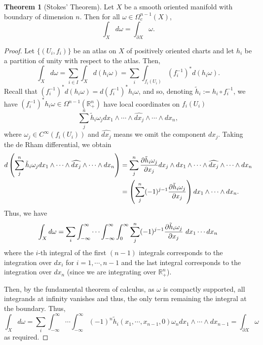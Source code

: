 \documentclass[]{article}
\theoremstyle{definition}
\newtheorem{theorem}{Theorem}
\theoremstyle{definition}
\begin{document}
\begin{theorem}[Stokes' Theorem]
  Let \(X\) be a smooth oriented manifold with boundary of dimension \(n\). 
  Then for all \(\omega \in \Omega^{n - 1}_c(X)\), 
  \[\int_X d\omega = \int_{\partial X}\omega.\]  
\end{theorem}
\begin{proof}
  Let \(\{(U_i, f_i)\}\) be an atlas on \(X\) of positively oriented charts and 
  let \(h_i\) be a partition of unity with respect to the atlas. Then, 
  \[\int_X d\omega = \sum_{i \in I}\int_X d(h_i \omega) 
    = \sum_i \int_{f_i(U_i)} (f_i^{-1})^* d(h_i \omega).\]
  Recall that \((f_i^{-1})^* d(h_i\omega) = d(f_i^{-1})^* h_i\omega\), and so, 
  denoting \(\tilde h_i := h_i \circ f_i^{-1}\), we have 
  \((f_i^{-1})^* h_i \omega \in \Omega^{n-1}(\mathbb{R}^n_+)\) have local 
  coordinates on \(f_i(U_i)\) 
  \[\sum_j^n \tilde h_i \omega_j dx_1 \wedge \cdots \wedge \widehat{dx_j} \wedge 
    \cdots \wedge dx_n,\]
  where \(\omega_j \in C^\infty(f_i(U_i))\) and \(\widehat{dx_j}\) means we omit 
  the component \(dx_j\). Taking the de Rham differential, we obtain 
  \[\begin{split}
    d\left(\sum_j^n \tilde h_i \omega_j dx_1 \wedge \cdots \wedge \widehat{dx_j} \wedge 
  \cdots \wedge dx_n\right) 
  & = \sum_j^n \pdv{\tilde h_i \omega_j}{x_j} dx_j \wedge
  dx_1 \wedge \cdots \wedge \widehat{dx_j} \wedge 
  \cdots \wedge dx_n\\
  & = \left(\sum_j^n (-1)^{j - 1}\pdv{\tilde h_i \omega_j}{x_j}\right)
  dx_1 \wedge \cdots \wedge dx_n.
  \end{split}\]
  Thus, we have 
  \[\int_X d\omega = \sum_i \int_{-\infty}^\infty \cdots \int_{-\infty}^\infty \int_0^\infty 
  \sum_j^n (-1)^{j - 1}\pdv{\tilde h_i \omega_j}{x_j}\ dx_1 \cdots dx_n\]
  where the \(i\)-th integral of the first \((n - 1)\) integrals corresponds to 
  the integration over \(dx_i\) for \(i = 1, \cdots, n - 1\) and the last 
  integral corresponds to the integration over \(dx_n\) (since we are integrating 
  over \(\mathbb{R}^n_+\)). 

  Then, by the fundamental theorem of calculus, as \(\omega\) is compactly supported, 
  all integrands at infinity vanishes and thus, the only term remaining the integral 
  at the boundary. Thus, 
  \[\int_X d\omega = \sum_i \int_{-\infty}^\infty \cdots \int_{-\infty}^\infty 
  (-1)^n \tilde h_i(x_1, \cdots, x_{n - 1}, 0) \omega_n dx_1 \wedge \cdots \wedge dx_{n - 1} 
  = \int_{\partial X} \omega\]
  as required.
\end{proof}
\end{document}
